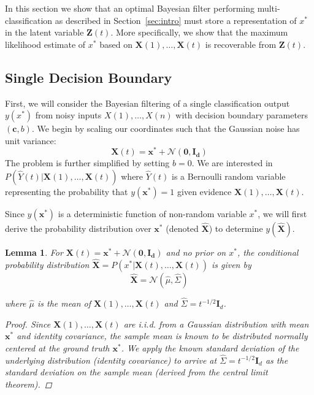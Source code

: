 \documentclass[12pt]{article}
\newtheorem{lemma}{Lemma}
\begin{document}
In this section we show that an optimal Bayesian filter performing multi-classification as described in Section~\ref{sec:intro} must store a representation of $x^*$ in the latent variable $\mathbf Z(t)$. 
More specifically, we show that the maximum likelihood estimate of $x^*$ based on $\mathbf X(1), \dots, \mathbf X(t)$ is recoverable from $\mathbf Z(t)$.


\subsection{Single Decision Boundary}

First, we will consider the Bayesian filtering of a single classification output $y(x^*)$ from noisy inputs $X(1), \dots, X(n)$ with decision boundary parameters $(\mathbf c, b)$. 
We begin by scaling our coordinates such that the Gaussian noise has unit variance:
\begin{equation}
	\mathbf X(t) = \mathbf x^* + \mathcal N(\mathbf{0, I_d})
\end{equation}
The problem is further simplified by setting $b = 0$. 
We are interested in $P(\hat Y(t) | \mathbf X(1), \dots, \mathbf X(t))$ where $\hat Y(t)$ is a Bernoulli random variable representing the probability that $y(\mathbf x^*) = 1$ given evidence $\mathbf X(1), \dots, \mathbf X(t)$. 

Since $y(\mathbf x^*)$ is a deterministic function of non-random variable $x^*$, we will first derive the probability distribution over $\mathbf x^*$ (denoted $\hat{\mathbf X}$) to determine $y(\hat{\mathbf X})$. 

\begin{lemma}
	\label{lemma:x_star_estimate}
	For $\mathbf X(t) = \mathbf x^* + \mathcal N(\mathbf{0, I_d})$ and no prior on $x^*$, the conditional probability distribution $\hat{\mathbf X} = P(x^* | \mathbf X(t), \dots, \mathbf X(t))$ is given by 
	\begin{equation}
		\hat{\mathbf X} = \mathcal N(\hat \mu, \hat \Sigma)
	\end{equation}

	where $\hat \mu$ is the mean of $\mathbf X(1), \dots, \mathbf X(t)$ and $\hat \Sigma = t^{-1/2} \mathbf I_d$. 

	\begin{proof}
		Since $\mathbf X(1), \dots, \mathbf X(t)$ are i.i.d. from a Gaussian distribution with mean $\mathbf x^*$ and identity covariance, the sample mean is known to be distributed normally centered at the ground truth $\mathbf x^*$. 
		We apply the known standard deviation of the underlying distribution (identity covariance) to arrive at $\hat \Sigma = t^{-1/2} \mathbf I_d$ as the standard deviation on the sample mean (derived from the central limit theorem). 
	\end{proof}
\end{lemma}
\end{document}
